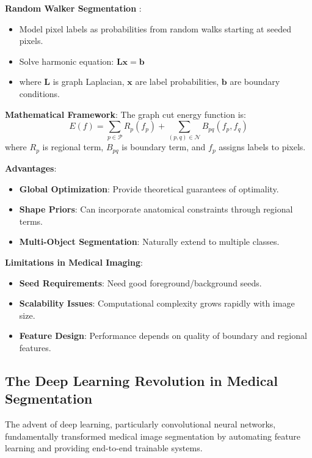 \documentclass[12pt,a4paper]{article}
\begin{document}
\textbf{Random Walker Segmentation} \cite{grady2006random}:
\begin{itemize}
    \item Model pixel labels as probabilities from random walks starting at seeded pixels.
    \item Solve harmonic equation: $\mathbf{L} \mathbf{x} = \mathbf{b}$
    \item where $\mathbf{L}$ is graph Laplacian, $\mathbf{x}$ are label probabilities, $\mathbf{b}$ are boundary conditions.
\end{itemize}

\textbf{Mathematical Framework}:
The graph cut energy function is:
\begin{equation}
E(f) = \sum_{p \in \mathcal{P}} R_p(f_p) + \sum_{(p,q) \in \mathcal{N}} B_{pq}(f_p, f_q)
\end{equation}
where $R_p$ is regional term, $B_{pq}$ is boundary term, and $f_p$ assigns labels to pixels.

\textbf{Advantages}:
\begin{itemize}
    \item \textbf{Global Optimization}: Provide theoretical guarantees of optimality.
    \item \textbf{Shape Priors}: Can incorporate anatomical constraints through regional terms.
    \item \textbf{Multi-Object Segmentation}: Naturally extend to multiple classes.
\end{itemize}

\textbf{Limitations in Medical Imaging}:
\begin{itemize}
    \item \textbf{Seed Requirements}: Need good foreground/background seeds.
    \item \textbf{Scalability Issues}: Computational complexity grows rapidly with image size.
    \item \textbf{Feature Design}: Performance depends on quality of boundary and regional features.
\end{itemize}

\subsection{The Deep Learning Revolution in Medical Segmentation}

The advent of deep learning, particularly convolutional neural networks, fundamentally transformed medical image segmentation by automating feature learning and providing end-to-end trainable systems.
\end{document}
